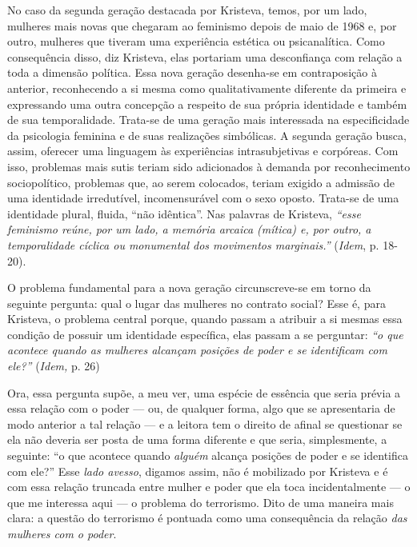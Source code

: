 No caso da segunda geração destacada por Kristeva, temos, por um lado,
mulheres mais novas que chegaram ao feminismo depois de maio de 1968 e,
por outro, mulheres que tiveram uma experiência estética ou
psicanalítica. Como consequência disso, diz Kristeva, elas portariam uma
desconfiança com relação a toda a dimensão política. Essa nova geração
desenha-se em contraposição à anterior, reconhecendo a si mesma como
qualitativamente diferente da primeira e expressando uma outra concepção
a respeito de sua própria identidade e também de sua temporalidade.
Trata-se de uma geração mais interessada na especificidade da psicologia
feminina e de suas realizações simbólicas. A segunda geração busca,
assim, oferecer uma linguagem às experiências intrasubjetivas e
corpóreas. Com isso, problemas mais sutis teriam sido adicionados à
demanda por reconhecimento sociopolítico, problemas que, ao serem
colocados, teriam exigido a admissão de uma identidade irredutível,
incomensurável com o sexo oposto. Trata-se de uma identidade plural,
fluida, ``não idêntica''. Nas palavras de Kristeva, \emph{``esse
feminismo reúne, por um lado, a memória arcaica (mítica) e, por outro, a
temporalidade cíclica ou monumental dos movimentos marginais.''}
(\emph{Idem}, p. 18-20).

O problema fundamental para a nova geração circunscreve-se em torno da
seguinte pergunta: qual o lugar das mulheres no contrato social? Esse é,
para Kristeva, o problema central porque, quando passam a atribuir a si
mesmas essa condição de possuir um identidade específica, elas passam a
se perguntar: \emph{``o que acontece quando as mulheres alcançam
posições de poder e se identificam com ele?''} (\emph{Idem,} p. 26)

Ora, essa pergunta supõe, a meu ver, uma espécie de essência que seria
prévia a essa relação com o poder --- ou, de qualquer forma, algo que se
apresentaria de modo anterior a tal relação --- e a leitora tem o direito
de afinal se questionar se ela não deveria ser posta de uma forma
diferente e que seria, simplesmente, a seguinte: ``o que acontece quando
\emph{alguém} alcança posições de poder e se identifica com ele?'' Esse
\emph{lado avesso}, digamos assim, não é mobilizado por Kristeva e é com
essa relação truncada entre mulher e poder que ela toca incidentalmente
--- o que me interessa aqui --- o problema do terrorismo. Dito de uma
maneira mais clara: a questão do terrorismo é pontuada como uma
consequência da relação \emph{das mulheres com o poder}.

